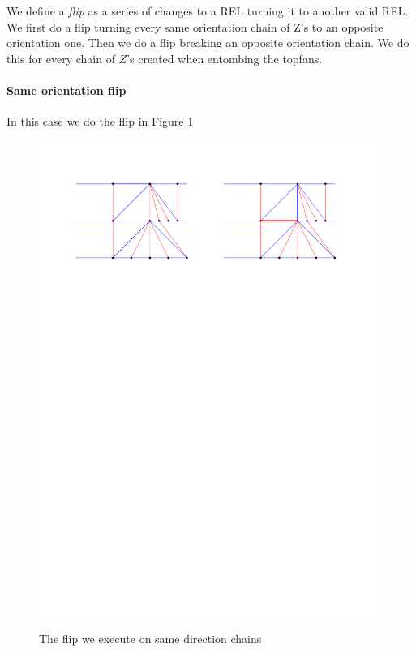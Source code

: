 We define a \emph{flip} as a series of changes to a REL turning it to another valid REL.
We first do a flip turning every same orientation chain of Z's to an opposite orientation one. Then we do a flip breaking an opposite orientation chain. We do this for every chain of $Z$'s created when entombing the topfans.  


\paragraph{Same orientation flip}

In this case we do the flip in Figure \ref{fig:uni:sameFlip}

\begin{figure}[h]
  \centering
  \includegraphics[width =\textwidth]{unifiedAlgo/img/post/sameFlip}
  \caption{The flip we execute on same direction chains}
  \label{fig:uni:sameFlip}
\end{figure}

